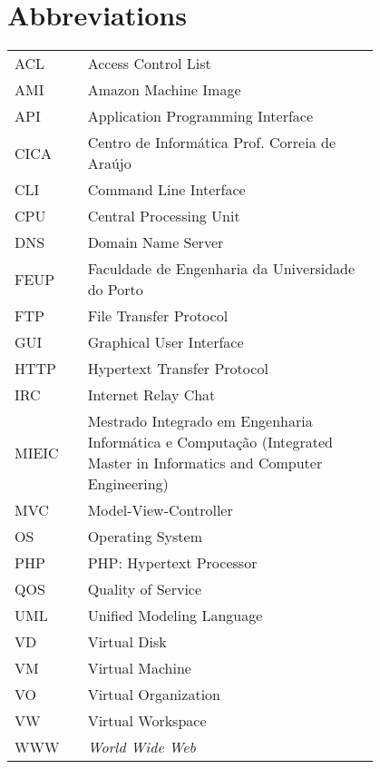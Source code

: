 \chapter*{Abbreviations}\label{chap:abbrev}

\begin{flushleft}
\begin{tabular}{l p{0.8\linewidth}}
ACL	 & Access Control List\\
AMI	 & Amazon Machine Image\\
API	 & Application Programming Interface\\
CICA	 & Centro de Informática Prof. Correia de Araújo\\
CLI	 & Command Line Interface\\
CPU	 & Central Processing Unit\\
DNS	 & Domain Name Server\\
FEUP	 & Faculdade de Engenharia da Universidade do Porto\\
FTP	 & File Transfer Protocol\\
GUI	 & Graphical User Interface\\
HTTP	 & Hypertext Transfer Protocol\\
IRC	 & Internet Relay Chat\\
MIEIC	 & Mestrado Integrado em Engenharia Informática e Computação (Integrated Master in Informatics and Computer Engineering)\\
MVC	 & Model-View-Controller\\
OS	 & Operating System\\
PHP	 & PHP: Hypertext Processor\\
QOS	 & Quality of Service\\
UML	 & Unified Modeling Language\\
VD	 & Virtual Disk\\
VM	 & Virtual Machine\\
VO	 & Virtual Organization\\
VW	 & Virtual Workspace\\
WWW      & \emph{World Wide Web}
\end{tabular}
\end{flushleft}

